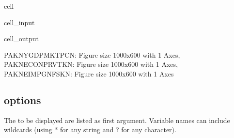 \documentclass[letterpaper,10pt,english]{jupyterBook}
\begin{document}
\begin{sphinxuseclass}{cell}\begin{sphinxVerbatimInput}

\begin{sphinxuseclass}{cell_input}
\begin{sphinxVerbatim}[commandchars=\\\{\}]
  
\end{sphinxVerbatim}

\end{sphinxuseclass}\end{sphinxVerbatimInput}
\begin{sphinxVerbatimOutput}

\begin{sphinxuseclass}{cell_output}
\noindent{}

\noindent{}

\noindent{}

\begin{sphinxVerbatim}[commandchars=\\\{\}]
\PYGZob{}\PYGZsq{}PAKNYGDPMKTPCN\PYGZsq{}: \PYGZlt{}Figure size 1000x600 with 1 Axes\PYGZgt{},
 \PYGZsq{}PAKNECONPRVTKN\PYGZsq{}: \PYGZlt{}Figure size 1000x600 with 1 Axes\PYGZgt{},
 \PYGZsq{}PAKNEIMPGNFSKN\PYGZsq{}: \PYGZlt{}Figure size 1000x600 with 1 Axes\PYGZgt{}\PYGZcb{}
\end{sphinxVerbatim}

\end{sphinxuseclass}\end{sphinxVerbatimOutput}

\end{sphinxuseclass}

\subsection{ options}
\label{\detokenize{content/05_WBModels/ScenarioAnalysis:keep-plot-options}}
\sphinxAtStartPar
The  to be displayed are listed as first argument. Variable names can include
wildcards (using * for any string and ? for any character).
\end{document}
